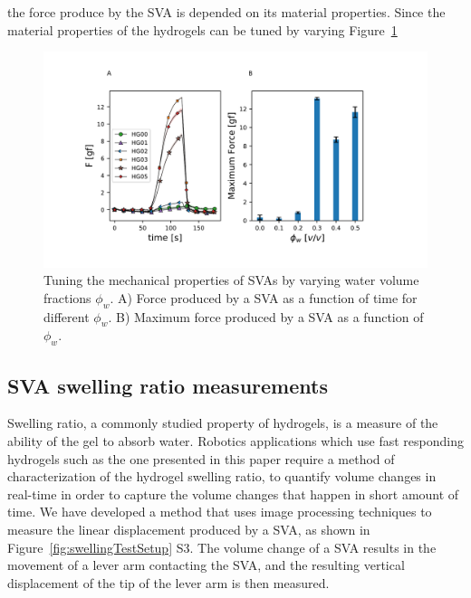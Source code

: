 the force produce by the SVA is depended on its material properties. Since the material properties of the hydrogels can be tuned by varying Figure~\ref{fig:svaForce}
\begin{figure}[!htb]
\centering
\includegraphics[width=\textwidth]{svaForce.pdf}
    \caption{Tuning the mechanical properties of SVAs by varying water volume fractions $\phi_{w}$. A) Force produced by a SVA as a function of time for different $\phi_{w}$. B) Maximum force produced by a SVA as a function of $\phi_{w}$. }
    \label{fig:svaForce}
\end{figure}

\subsection{SVA swelling ratio measurements}
Swelling ratio, a commonly studied property of hydrogels, is a measure of the ability of the gel to absorb water. Robotics applications which use fast responding hydrogels such as the one presented in this paper require a method of characterization of the hydrogel swelling ratio, to quantify volume changes in real-time in order to capture the volume changes that happen in short amount of time. We have developed a method that uses image processing techniques to measure the linear displacement produced by a SVA, as shown in Figure~\ref{fig:swellingTestSetup} S3. The volume change of a SVA results in the movement of a lever arm contacting the SVA, and the resulting vertical displacement of the tip of the lever arm is then measured. 


